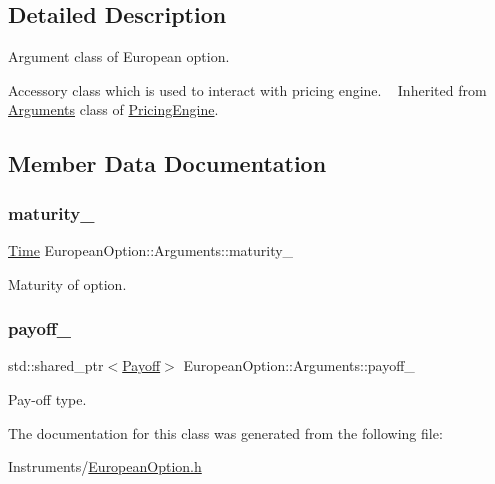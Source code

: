 \subsection{Detailed Description}
Argument class of European option. 

Accessory class which is used to interact with pricing engine. ~\newline
Inherited from \hyperlink{class_european_option_1_1_arguments}{Arguments} class of \hyperlink{class_pricing_engine}{Pricing\+Engine}. 

\subsection{Member Data Documentation}
\hypertarget{class_european_option_1_1_arguments_a75cb97c8679f5827e3faa8db031e5196}{}\label{class_european_option_1_1_arguments_a75cb97c8679f5827e3faa8db031e5196} 
\subsubsection{\texorpdfstring{maturity\+\_\+}{maturity\_}}
{\footnotesize\ttfamily \hyperlink{_name_def_8h_ac2d3e0ba793497bcca555c7c2cf64ff3}{Time} European\+Option\+::\+Arguments\+::maturity\+\_\+}



Maturity of option. 

\hypertarget{class_european_option_1_1_arguments_a01a26c6641a2bb9f439c4191c5eb7d76}{}\label{class_european_option_1_1_arguments_a01a26c6641a2bb9f439c4191c5eb7d76} 
\subsubsection{\texorpdfstring{payoff\+\_\+}{payoff\_}}
{\footnotesize\ttfamily std\+::shared\+\_\+ptr$<$\hyperlink{class_payoff}{Payoff}$>$ European\+Option\+::\+Arguments\+::payoff\+\_\+}



Pay-\/off type. 



The documentation for this class was generated from the following file\+:\begin{DoxyCompactItemize}
\item 
Instruments/\hyperlink{_european_option_8h}{European\+Option.\+h}\end{DoxyCompactItemize}
